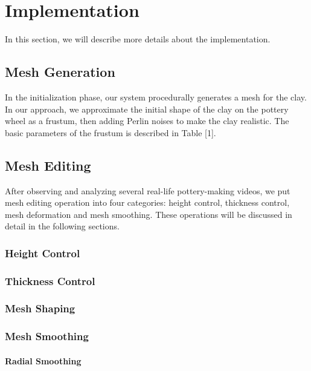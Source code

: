 \section{Implementation}
\label{sec:1}

In this section, we will describe more details about the implementation. 



\subsection{Mesh Generation}
\label{sec:2}

In the initialization phase, our system procedurally generates a mesh for the clay. In our approach, we approximate the initial shape of the clay on the pottery wheel as a frustum, then adding Perlin noises to make the clay realistic. The basic parameters of the frustum is described in Table [1].


\subsection{Mesh Editing}
\label{sec:2}
After observing and analyzing several real-life pottery-making videos, we put mesh editing operation into four categories: height control, thickness control, mesh deformation and mesh smoothing. These operations will be discussed in detail in the following sections.

\subsubsection{Height Control}
\label{sec:3}

\subsubsection{Thickness Control}
\label{sec:3}

\subsubsection{Mesh Shaping}
\label{sec:3}

\subsubsection{Mesh Smoothing}
\label{sec:3}

\paragraph{Radial Smoothing}

